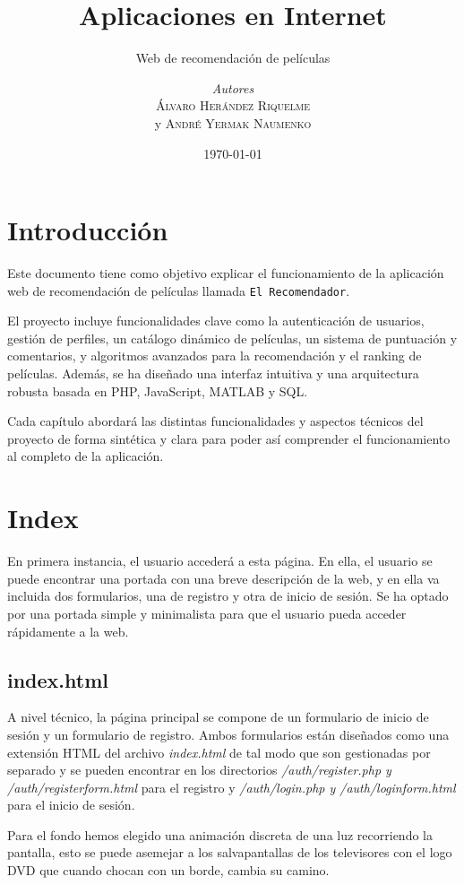 \documentclass[a4paper, 12pt]{report}
\institute{Universidad Politécnica de Cartagena}
\title{Aplicaciones en Internet}
\subtitle{Web de recomendación de películas}
\author{\textit{Autores}\\\textsc{Álvaro Herández Riquelme}\\ y \textsc{André Yermak Naumenko}}
\date{\today}
\begin{document}
    \maketitle
    \romantableofcontents



    \newpage
    \newpage

    \chapter{Introducción}
    Este documento tiene como objetivo explicar el funcionamiento de la aplicación web de recomendación de películas llamada \texttt{El Recomendador}.

    El proyecto incluye funcionalidades clave como la autenticación de usuarios, gestión de perfiles, un catálogo dinámico de películas, un sistema de puntuación y comentarios, y algoritmos avanzados para la recomendación y el ranking de películas. Además, se ha diseñado una interfaz intuitiva y una arquitectura robusta basada en PHP, JavaScript, MATLAB y SQL.

    Cada capítulo abordará las distintas funcionalidades y aspectos técnicos del proyecto de forma sintética y clara para poder así comprender el funcionamiento al completo de la aplicación.
    \chapter{Index}

    En primera instancia, el usuario accederá a esta página. En ella, el usuario se puede encontrar una portada con una breve descripción de la web, y en ella va incluida dos formularios, una de registro y otra de inicio de sesión. Se ha optado por una portada simple y minimalista para que el usuario pueda acceder rápidamente a la web.
    \section{index.html}

    A nivel técnico, la página principal se compone de un formulario de inicio de sesión y un formulario de registro. Ambos formularios están diseñados como una extensión HTML del archivo \textit{index.html} de tal modo que son gestionadas por separado y se pueden encontrar en los directorios \textit{/auth/register.php y /auth/registerform.html} para el registro y \textit{/auth/login.php y /auth/loginform.html} para el inicio de sesión.

    Para el fondo hemos elegido una animación discreta de una luz recorriendo la pantalla, esto se puede asemejar a los salvapantallas de los televisores con el logo DVD que cuando chocan con un borde, cambia su camino.
\end{document}
